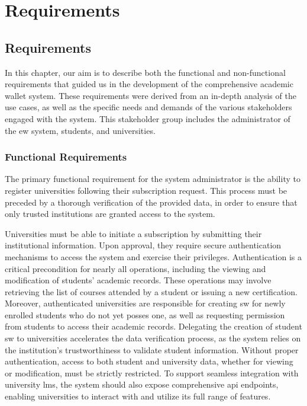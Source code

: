 \chapter{Requirements}

\section{Requirements}
In this chapter, our aim is to describe both the functional and non-functional requirements that guided us in the development of the comprehensive academic wallet system. These requirements were derived from an in-depth analysis of the use cases, as well as the specific needs and demands of the various stakeholders engaged with the system. This stakeholder group includes the administrator of the \acrfull{ew} system, students, and universities.

\subsection{Functional Requirements}
The primary functional requirement for the system administrator is the ability to register universities following their subscription request. This process must be preceded by a thorough verification of the provided data, in order to ensure that only trusted institutions are granted access to the system.

Universities must be able to initiate a subscription by submitting their institutional information. Upon approval, they require secure authentication mechanisms to access the system and exercise their privileges. Authentication is a critical precondition for nearly all operations, including the viewing and modification of students' academic records. These operations may involve retrieving the list of courses attended by a student or issuing a new certification. Moreover, authenticated universities are responsible for creating \acrfull{sw} for newly enrolled students who do not yet posses one, as well as requesting permission from students to access their academic records. Delegating the creation of student \acrshort{sw} to universities accelerates the data verification process, as the system relies on the institution's trustworthiness to validate student information. Without proper authentication, access to both student and university data, whether for viewing or modification, must be strictly restricted. To support seamless integration with university \acrfull{lms}, the system should also expose comprehensive \acrfull{api} endpoints, enabling universities to interact with and utilize its full range of features.

